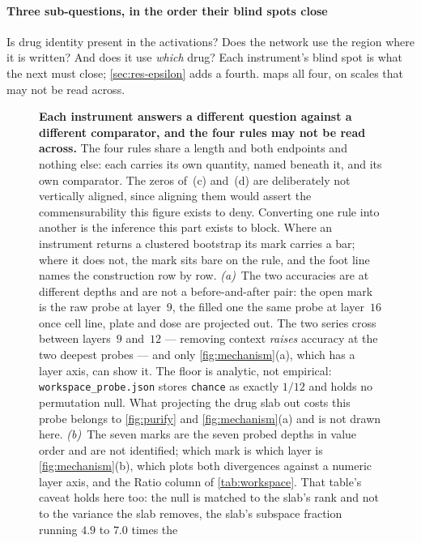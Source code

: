 \paragraph{Three sub-questions, in the order their blind spots close} Is drug
identity present in the activations? Does the network use the region where it is
written? And does it use \emph{which} drug? Each instrument's blind spot is what
the next must close; \cref{sec:res-epsilon} adds a fourth.
 maps all four, on scales that may not be read across.

\begin{figure}[htbp]
\begin{fullwidth}
\centering

\caption[Four questions, four comparators]{\textbf{Each instrument answers a
different question against a different comparator, and the four rules may not
be read across.} The four rules share a length and both endpoints and nothing
else: each carries its own quantity, named beneath it, and its own comparator.
The zeros of~(c) and~(d) are deliberately not vertically aligned, since
aligning them would assert the commensurability this figure exists to deny.
Converting one rule into another is the inference this part exists to block.
Where an instrument returns a clustered bootstrap its mark carries a bar; where
it does not, the mark sits bare on the rule, and the foot line names the
construction row by row. \emph{(a)}~The two accuracies are at different depths
and are not a before-and-after pair: the open mark is the raw probe at
layer~$9$, the filled one the same probe at layer~$16$ once cell line, plate
and dose are projected out. The two series cross between layers~$9$ and~$12$
--- removing context \emph{raises} accuracy at the two deepest probes --- and
only \cref{fig:mechanism}(a), which has a layer axis, can show it. The floor is
analytic, not empirical: \texttt{workspace\_probe.json} stores \texttt{chance}
as exactly $1/12$ and holds no permutation null. What projecting the drug slab
out costs this probe belongs to \cref{fig:purify} and \cref{fig:mechanism}(a)
and is not drawn here. \emph{(b)}~The seven marks are the seven probed depths
in value order and are not identified; which mark is which layer is
\cref{fig:mechanism}(b), which plots both divergences against a numeric layer
axis, and the Ratio column of \cref{tab:workspace}. That table's caveat holds
here too: the null is matched to the slab's rank and not to the variance the
slab removes, the slab's subspace fraction running $4.9$ to $7.0$ times the
}
\end{fullwidth}
\end{figure}
